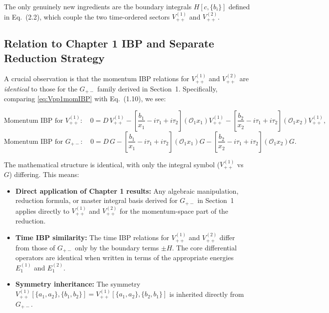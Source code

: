 \documentclass[a4paper,12pt]{article}
\begin{document}
The only genuinely new ingredients are the boundary integrals $H[c,\{b_i\}]$ defined in Eq.~(2.2), which couple the two time‑ordered sectors $V_{++}^{(1)}$ and $V_{++}^{(2)}$.

\subsection{Relation to Chapter 1 IBP and Separate Reduction Strategy}

A crucial observation is that the momentum IBP relations for $V_{++}^{(1)}$ and $V_{++}^{(2)}$ are \emph{identical} to those for the $G_{+-}$ family derived in Section~1. Specifically, comparing \eqref{eq:Vpp1momIBP} with Eq.~(1.10), we see:

\begin{equation}
	\text{Momentum IBP for } V_{++}^{(1)}: \quad 0 = D\, V_{++}^{(1)} - \left[\frac{b_1}{x_1} - i\tau_1 + i\tau_2\right](\mathcal{O}_1 x_1) V_{++}^{(1)} - \left[\frac{b_2}{x_2} - i\tau_1 + i\tau_2\right](\mathcal{O}_1 x_2) V_{++}^{(1)},
\end{equation}
\begin{equation}
	\text{Momentum IBP for } G_{+-}: \quad 0 = D\, G - \left[\frac{b_1}{x_1} - i\tau_1 + i\tau_2\right](\mathcal{O}_1 x_1) G - \left[\frac{b_2}{x_2} - i\tau_1 + i\tau_2\right](\mathcal{O}_1 x_2) G.
\end{equation}

The mathematical structure is identical, with only the integral symbol ($V_{++}^{(1)}$ vs $G$) differing. This means:

\begin{itemize}
	\item \textbf{Direct application of Chapter 1 results:} Any algebraic manipulation, reduction formula, or master integral basis derived for $G_{+-}$ in Section~1 applies directly to $V_{++}^{(1)}$ and $V_{++}^{(2)}$ for the momentum-space part of the reduction.

	\item \textbf{Time IBP similarity:} The time IBP relations for $V_{++}^{(1)}$ and $V_{++}^{(2)}$ differ from those of $G_{+-}$ only by the boundary terms $\pm H$. The core differential operators are identical when written in terms of the appropriate energies $E_1^{(1)}$ and $E_1^{(2)}$.

	\item \textbf{Symmetry inheritance:} The symmetry $V_{++}^{(1)}[\{a_1,a_2\},\{b_1,b_2\}] = V_{++}^{(1)}[\{a_1,a_2\},\{b_2,b_1\}]$ is inherited directly from $G_{+-}$.
\end{itemize}
\end{document}
